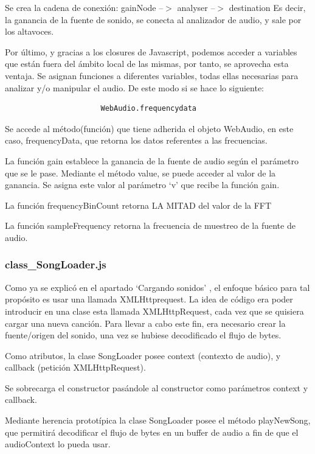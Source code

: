 Se crea la cadena de conexión: gainNode --$>$ analyser --$>$ destination
Es decir, la ganancia de la fuente de sonido, se conecta al analizador de audio, y sale por los altavoces.

Por último, y gracias a los closures de Javascript, podemos acceder a variables que están fuera del ámbito local de las mismas, por tanto, se aprovecha esta ventaja. 
Se asignan funciones a diferentes variables, todas ellas necesarias para analizar y/o manipular el audio. De este modo si se hace lo siguiente:

\begin{verbatim}
                      WebAudio.frequencydata
\end{verbatim}

Se accede al método(función) que tiene adherida el objeto WebAudio, en este caso, frequencyData, que retorna los datos referentes a las frecuencias.

La función gain establece la ganancia de la fuente de audio según el parámetro que se le pase. Mediante el método value, se puede acceder al valor de la ganancia. Se asigna este valor al parámetro ‘v’ que recibe la función gain.

La función frequencyBinCount  retorna LA MITAD del valor de la FFT

La función sampleFrequency  retorna la frecuencia de muestreo de la fuente de audio.


\subsubsection{class\_SongLoader.js}
\label{sec:song_loader}
Como ya se explicó en el apartado ‘Cargando sonidos’ , el enfoque básico para tal propósito es usar una llamada XMLHttprequest. La idea de código era poder introducir en una clase esta llamada XMLHttpRequest, cada vez que se quisiera cargar una nueva canción. Para llevar a cabo este fin, era necesario crear la fuente/origen del sonido, una vez se hubiese decodificado el flujo de bytes. 

Como atributos, la clase SongLoader posee context (contexto de audio), y callback (petición XMLHttpRequest). 

Se sobrecarga el constructor pasándole al constructor como parámetros context y callback.

Mediante herencia prototípica la clase SongLoader posee el método playNewSong, que permitirá decodificar el flujo de bytes en un buffer de audio a fin de que el audioContext lo pueda usar.

